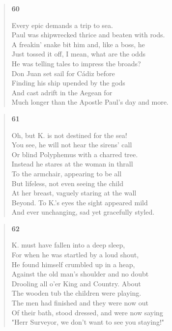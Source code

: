 \documentclass{article}
\begin{document}
\newpage
\begin{verse}
  \begin{center}
    \textbf{60} \\
  \end{center}
  Every epic demands a trip to sea. \\
  Paul was shipwrecked thrice and beaten with rods. \\
  A freakin' snake bit him and, like a boss, he \\
  Just tossed it off, I mean, what are the odds \\
  He was telling tales to impress the broads? \\
  Don Juan set sail for Cádiz before \\
  Finding his ship upended by the gods \\
  And cast adrift in the Aegean for \\
  Much longer than the Apostle Paul's day and more.
\end{verse}
\begin{verse}
  \begin{center}
    \textbf{61} \\
  \end{center}
  Oh, but K. is not destined for the sea! \\
  You see, he will not hear the sirens' call \\
  Or blind Polyphemus with a charred tree. \\
  Instead he stares at the woman in thrall \\
  To the armchair, appearing to be all \\
  But lifeless, not even seeing the child \\
  At her breast, vaguely staring at the wall \\
  Beyond. To K.'s eyes the sight appeared mild \\
  And ever unchanging, sad yet gracefully styled.
\end{verse}

\begin{verse}
  \begin{center}
    \textbf{62} \\
  \end{center}
  K. must have fallen into a deep sleep, \\
  For when he was startled by a loud shout, \\
  He found himself crumbled up in a heap, \\
  Against the old man's shoulder and no doubt \\
  Drooling all o'er King and Country. About \\
  The wooden tub the children were playing. \\
  The men had finished and they were now out \\
  Of their bath, stood dressed, and were now saying \\
  "Herr Surveyor, we don't want to see you staying!"
\end{verse}
\end{document}
